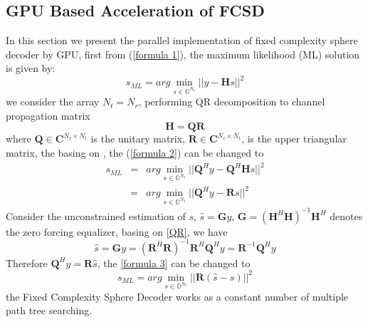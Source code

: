 \documentclass[12pt,a4paper,final]{article}
\begin{document}
\begin{spacing}{2.5}
\section{GPU Based Acceleration of FCSD}
In this section we present the parallel implementation of fixed complexity sphere decoder by GPU, first from (\ref{formula 1}), the maximum likelihood (ML) solution is given by:
\begin{equation}
s_{ML}=arg\min_{s\in \mathbb{O}^{N_{t}}}||y-\mathbf{H}s||^{2} \label{formula 2}
\end{equation}
we consider the array $N_{t}=N_{r}$, performing QR decomposition to channel propagation matrix
\begin{equation}
 \mathbf{H}=\mathbf{Q}\mathbf{R}  \label{QR}
\end{equation}
where $\mathbf{Q}\in \mathbf{C}^{N_{t}\times N_{t}}$ is the unitary matrix, $\mathbf{R}\in \mathbf{C}^{N_{t}\times N_{t}}$, is the upper triangular matrix, the basing on \cite{matrix theory}, the (\ref{formula 2}) can be changed to
\begin{eqnarray}
\nonumber
s_{ML}&=&arg\min_{s\in \mathbb{O}^{N_{t}}}||\mathbf{Q}^{H}y-\mathbf{Q}^{H}\mathbf{H}s||^{2}\\
&=& arg\min_{s\in \mathbb{O}^{N_{t}}}||\mathbf{Q}^{H}y-\mathbf{R}s||^{2} \label{formula 3}
\end{eqnarray}
Consider the unconstrained estimation of $s$, $\hat{s}=\mathbf{G}y$, $\mathbf{G}=(\mathbf{H}^{H}\mathbf{H})^{-1}\mathbf{H}^{H}$ denotes the zero forcing equalizer, basing on \ref{QR}, we have  
\begin{equation}
\hat{s}=\mathbf{G}y=(\mathbf{R}^{H}\mathbf{R})^{-1}\mathbf{R}^{H}\mathbf{Q}^{H}y=\mathbf{R}^{-1}\mathbf{Q}^{H}y 
\label{unconstrained estimation}
\end{equation} 
Therefore $\mathbf{Q}^{H}y=\mathbf{R}\hat{s}$, the \ref{formula 3} can be changed to
\begin{equation}
s_{ML}=arg\min_{s\in \mathbb{O}^{N_{t}}}||\mathbf{R}(\hat{s}-s)||^{2} \label{formula 4}
\end{equation}
the Fixed Complexity Sphere Decoder works as a constant number of multiple path tree searching.
\begin{figure}[tb]
\centering

\end{figure}
\end{spacing}
\end{document}
